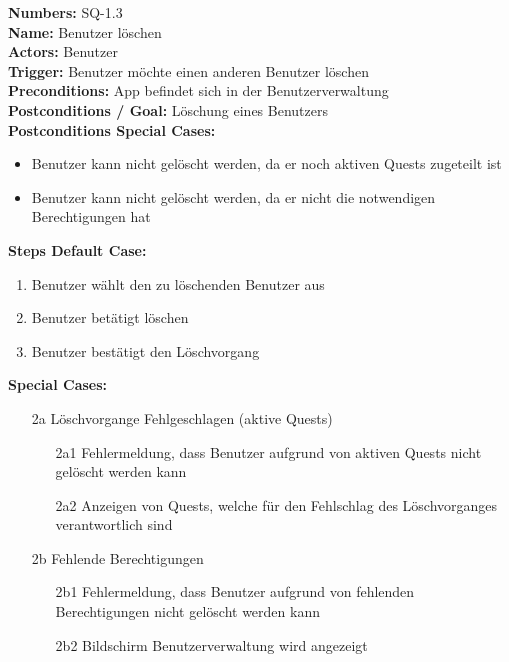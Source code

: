 \documentclass{article}
\begin{document}
\newpage
\begin{samepage}
    \textbf{Numbers:} SQ-1.3\\
    \textbf{Name:} Benutzer löschen\\
    \textbf{Actors:} Benutzer\\
    \textbf{Trigger:} Benutzer möchte einen anderen Benutzer löschen\\
    \textbf{Preconditions:}  App befindet sich in der Benutzerverwaltung\\
    \textbf{Postconditions / Goal:} Löschung eines Benutzers\\
    \textbf{Postconditions Special Cases:}
    \begin{itemize}
        \item Benutzer kann nicht gelöscht werden, da er noch aktiven Quests zugeteilt ist
        \item Benutzer kann nicht gelöscht werden, da er nicht die notwendigen Berechtigungen hat
    \end{itemize}
    \textbf{Steps Default Case:} 
    \begin{enumerate}
        \item Benutzer wählt den zu löschenden Benutzer aus
        \item Benutzer betätigt löschen
        \item Benutzer bestätigt den Löschvorgang
    \end{enumerate}
\textbf{Special Cases:}
\begin{itemize}
    \item [2a] Löschvorgange Fehlgeschlagen (aktive Quests)
    \begin{itemize}
        \item [2a1] Fehlermeldung, dass Benutzer aufgrund von aktiven Quests nicht gelöscht werden kann
        \item [2a2] Anzeigen von Quests, welche für den Fehlschlag des Löschvorganges verantwortlich sind
    \end{itemize}
    \item [2b] Fehlende Berechtigungen
    \begin{itemize}
        \item [2b1] Fehlermeldung, dass Benutzer aufgrund von fehlenden Berechtigungen nicht gelöscht werden kann
        \item [2b2] Bildschirm Benutzerverwaltung wird angezeigt 
    \end{itemize}
\end{itemize}
\end{samepage}
\end{document}
